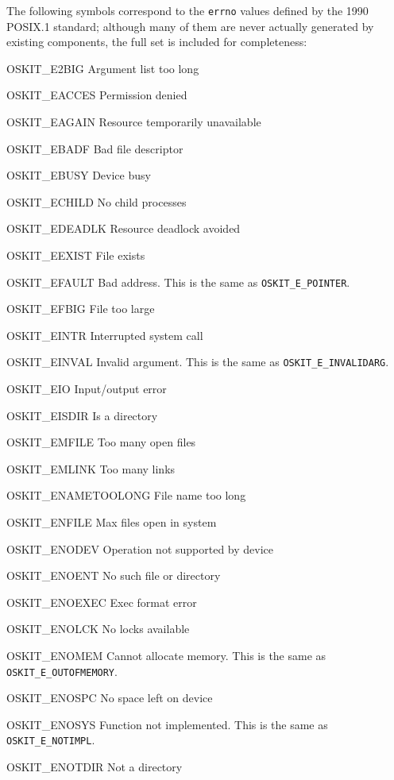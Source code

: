 \begin{apidesc}
	The following symbols correspond to the \texttt{errno} values
	defined by the 1990 POSIX.1 standard;
	although many of them are never actually generated
	by existing \oskit{} components,
	the full set is included for completeness:
	\begin{icsymlist}
	\item[OSKIT_E2BIG]		Argument list too long
	\item[OSKIT_EACCES]		Permission denied
	\item[OSKIT_EAGAIN]		Resource temporarily unavailable
	\item[OSKIT_EBADF]		Bad file descriptor
	\item[OSKIT_EBUSY]		Device busy
	\item[OSKIT_ECHILD]		No child processes
	\item[OSKIT_EDEADLK]		Resource deadlock avoided
	\item[OSKIT_EEXIST]		File exists
	\item[OSKIT_EFAULT]		Bad address.
					This is the same as
					\texttt{OSKIT_E_POINTER}.
	\item[OSKIT_EFBIG]		File too large
	\item[OSKIT_EINTR]		Interrupted system call
	\item[OSKIT_EINVAL]		Invalid argument.
					This is the same as
					\texttt{OSKIT_E_INVALIDARG}.
	\item[OSKIT_EIO]			Input/output error
	\item[OSKIT_EISDIR]		Is a directory
	\item[OSKIT_EMFILE]		Too many open files
	\item[OSKIT_EMLINK]		Too many links
	\item[OSKIT_ENAMETOOLONG]	File name too long
	\item[OSKIT_ENFILE]		Max files open in system
	\item[OSKIT_ENODEV]		Operation not supported by device
	\item[OSKIT_ENOENT]		No such file or directory
	\item[OSKIT_ENOEXEC]		Exec format error
	\item[OSKIT_ENOLCK]		No locks available
	\item[OSKIT_ENOMEM]		Cannot allocate memory.
					This is the same as
					\texttt{OSKIT_E_OUTOFMEMORY}.
	\item[OSKIT_ENOSPC]		No space left on device
	\item[OSKIT_ENOSYS]		Function not implemented.
					This is the same as
					\texttt{OSKIT_E_NOTIMPL}.
	\item[OSKIT_ENOTDIR]		Not a directory

\end{icsymlist}
\end{apidesc}
